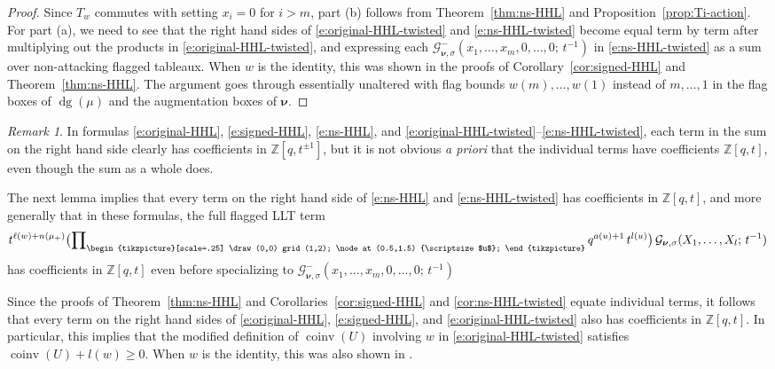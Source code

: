 \documentclass[12pt]{amsart}
\theoremstyle{definition}
\theoremstyle{remark}
\newtheorem{remark}[thm]{Remark}
\newcommand{\ZZ}{{\mathbb Z}}
\newcommand{\nubold}{{\boldsymbol \nu }}
\newcommand{\Gcal}{{\mathcal G}}
\newcommand{\domino}{\begin{tikzpicture}[scale=.25]
\draw (0,0) grid (1,2);
\node at (0.5,1.5) {\scriptsize $u$};
\end{tikzpicture}}
\DeclareMathOperator{\dg}{dg}
\DeclareMathOperator{\coinv}{coinv}
\begin{document}
\begin{proof}
Since $T_{w}$ commutes with setting $x_{i} = 0$ for $i>m$, part (b)
follows from Theorem~\ref{thm:ns-HHL} and
Proposition~\ref{prop:Ti-action}.  For part (a), we need to see that
the right hand sides of \eqref{e:original-HHL-twisted} and
\eqref{e:ns-HHL-twisted} become equal term by term after multiplying
out the products in \eqref{e:original-HHL-twisted}, and expressing
each $\Gcal _{\nubold ,\sigma }^{-}(x_{1},\ldots,x_{m},0,\ldots,0;\,
t^{-1})$ in \eqref{e:ns-HHL-twisted} as a sum over non-attacking
flagged tableaux.  When $w$ is the identity, this was shown in the
proofs of Corollary~\ref{cor:signed-HHL} and Theorem~\ref{thm:ns-HHL}.
The argument goes through essentially unaltered with flag bounds
$w(m),\ldots,w(1)$ instead of $m,\ldots,1$ in the flag boxes of $\dg
(\mu )$ and the augmentation boxes of $\nubold $.
\end{proof}

\begin{remark}\label{rem:coinv}
In formulas \eqref{e:original-HHL}, \eqref{e:signed-HHL},
\eqref{e:ns-HHL}, and
\eqref{e:original-HHL-twisted}--\eqref{e:ns-HHL-twisted}, each term in
the sum on the right hand side clearly has coefficients in $\ZZ
[q,t^{\pm 1}]$, but it is not obvious {\it a priori} that the
individual terms have coefficients $\ZZ [q,t]$, even though the sum as
a whole does.

The next lemma implies that every term on the right hand side of
\eqref{e:ns-HHL} and \eqref{e:ns-HHL-twisted} has coefficients in $\ZZ
[q,t]$, and more generally that in these formulas, the full flagged
LLT term
\begin{equation}\label{e:ns-HHL-twisted-full-term}
 t^{\ell (w)+n(\mu _{+})}  \bigl( \prod \nolimits_{\domino }
q^{a(u)+1}\, t^{l(u)} \bigr)\, \Gcal _{\nubold, \sigma
}(X_{1},\ldots,X_{l};\, t^{-1})
\end{equation}
has coefficients in $\ZZ
[q,t]$ even before specializing to $\Gcal ^{-}_{\nubold, \sigma
}(x_{1}, \ldots, x_{m}, 0, \ldots, 0;\, t^{-1})$

Since the proofs of Theorem~\ref{thm:ns-HHL} and
Corollaries~\ref{cor:signed-HHL} and \ref{cor:ns-HHL-twisted} equate
individual terms, it follows that every term on the right hand sides
of \eqref{e:original-HHL}, \eqref{e:signed-HHL}, and
\eqref{e:original-HHL-twisted} also has coefficients in $\ZZ [q,t]$.
In particular, this implies that the modified definition of $\coinv
(U)$ involving $w$ in \eqref{e:original-HHL-twisted} satisfies $\coinv
(U) + l(w)\geq 0$.  When $w$ is the identity, this was also shown in
\cite[Proposition~3.6.2]{HagHaiLo08}.
\end{remark}
\end{document}
